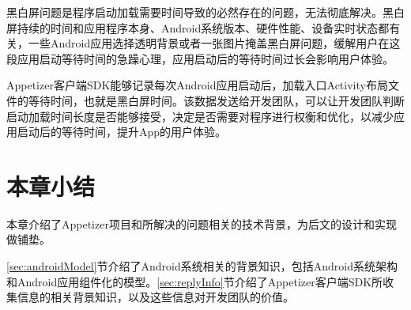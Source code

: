 黑白屏问题是程序启动加载需要时间导致的必然存在的问题，无法彻底解决。黑白屏持续的时间和应用程序本身、Android系统版本、硬件性能、设备实时状态都有关，一些Android应用选择透明背景或者一张图片掩盖黑白屏问题，缓解用户在这段应用启动等待时间的急躁心理，应用启动后的等待时间过长会影响用户体验。

Appetizer客户端SDK能够记录每次Android应用启动后，加载入口Activity布局文件的等待时间，也就是黑白屏时间。该数据发送给开发团队，可以让开发团队判断启动加载时间长度是否能够接受，决定是否需要对程序进行权衡和优化，以减少应用启动后的等待时间，提升App的用户体验。

\section{本章小结}

本章介绍了Appetizer项目和所解决的问题相关的技术背景，为后文的设计和实现做铺垫。

\ref{sec:androidModel}节介绍了Android系统相关的背景知识，包括Android系统架构和Android应用组件化的模型。\ref{sec:replyInfo}节介绍了Appetizer客户端SDK所收集信息的相关背景知识，以及这些信息对开发团队的价值。
